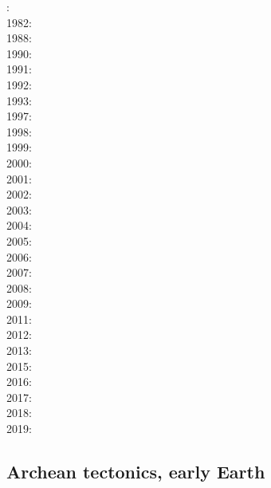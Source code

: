 {\scriptsize
{}: \cite{dixo75}\\
1982: \cite{tapl82}\\
1988: \cite{peta88}\cite{crud88}\\
1990: \cite{mccl90}\cite{jodc90}\\
1991: \cite{daco91}\\
1992: \cite{salt92}\\
1993: \cite{nabr93}\cite{shem93}\\
1997: \cite{vank97}\\
1998: \cite{bubr98}\\
1999: \cite{dava99}\cite{befo99}\cite{fagd99}\cite{nagg99}\\
2000: \cite{sche00}\cite{sobm00}\cite{chlb00}\\
2001: \cite{haki01}\cite{chys01}\\
2002: \cite{dagl02}\\
2003: \cite{smbs03}\cite{muso03}\cite{nagv03}\\
2004: \cite{sche04}\cite{sche04b}\\
2005: \cite{jujb05}\cite{sche05}\cite{sobb05}\\
2006: \cite{scbb06}\cite{tibs06}\cite{crnp06}\cite{lemm06}\cite{pabs06}\cite{malm06}\\
2007: \cite{socb07}\\
2008: \cite{clbz08}\cite{fufh08}\cite{esfm08}\\
2009: \cite{pina09}\cite{bonn09}\\
2011: \cite{dalt11}\cite{gopc11}\cite{grhd11}\\
2012: \cite{grmd12}\cite{iadc12}\\
2013: \cite{luws13}\cite{vadv13}\cite{guhf13}\cite{mibg13}\cite{mesc13}\cite{dusc13}\cite{kern13}\\
2015: \cite{casw15}\cite{rods15}\cite{kiff15}\cite{chsd15}\\
2016: \cite{scbb16}\cite{chss16}\\
2017: \cite{casw17}\\
2018: \cite{pirf18}\\
2019: \cite{mocb19}\cite{sccs19}\cite{muwm19}\cite{zwsr19}
}

\subsection{Archean tectonics, early Earth}

